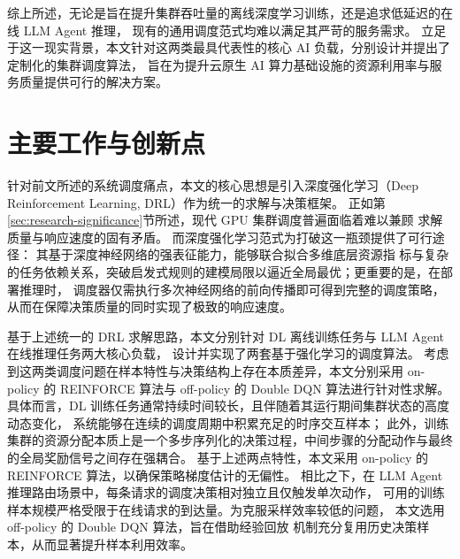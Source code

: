 

综上所述，无论是旨在提升集群吞吐量的离线深度学习训练，还是追求低延迟的在线 LLM Agent 推理，
现有的通用调度范式均难以满足其严苛的服务需求。
立足于这一现实背景，本文针对这两类最具代表性的核心 AI 负载，分别设计并提出了定制化的集群调度算法，
旨在为提升云原生 AI 算力基础设施的资源利用率与服务质量提供可行的解决方案。

\section{主要工作与创新点}

针对前文所述的系统调度痛点，本文的核心思想是引入深度强化学习（Deep Reinforcement Learning, DRL）作为统一的求解与决策框架。
正如第\ref{sec:research-significance}节所述，现代 GPU 集群调度普遍面临着难以兼顾
求解质量与响应速度的固有矛盾。
而深度强化学习范式为打破这一瓶颈提供了可行途径：
其基于深度神经网络的强表征能力，能够联合拟合多维底层资源指
标与复杂的任务依赖关系，突破启发式规则的建模局限以逼近全局最优；更重要的是，在部署推理时，
调度器仅需执行多次神经网络的前向传播即可得到完整的调度策略，
从而在保障决策质量的同时实现了极致的响应速度。

基于上述统一的 DRL 求解思路，本文分别针对 DL 离线训练任务与 LLM Agent 在线推理任务两大核心负载，
设计并实现了两套基于强化学习的调度算法。
考虑到这两类调度问题在样本特性与决策结构上存在本质差异，本文分别采用 on-policy 的
REINFORCE 算法与 off-policy 的 Double DQN 算法进行针对性求解。
具体而言，DL 训练任务通常持续时间较长，且伴随着其运行期间集群状态的高度动态变化，
系统能够在连续的调度周期中积累充足的时序交互样本；
此外，训练集群的资源分配本质上是一个多步序列化的决策过程，中间步骤的分配动作与最终的全局奖励信号之间存在强耦合。
基于上述两点特性，本文采用 on-policy 的 REINFORCE 算法，以确保策略梯度估计的无偏性。
相比之下，在 LLM Agent 推理路由场景中，每条请求的调度决策相对独立且仅触发单次动作，
可用的训练样本规模严格受限于在线请求的到达量。为克服采样效率较低的问题，
本文选用 off-policy 的 Double DQN 算法，旨在借助经验回放
机制充分复用历史决策样本，从而显著提升样本利用效率。

